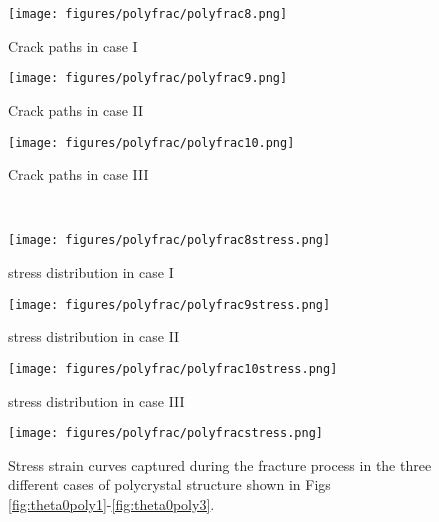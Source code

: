 \documentclass[3p,10pt,sort&compress]{elsarticle}
\begin{document}
\begin{figure*}[!htb]
	\centering
  \begin{subfigure}{0.32\textwidth}
		\texttt{[image: figures/polyfrac/polyfrac8.png]}
		\caption{Crack paths in case I}
	  \label{fig:fracpoly1}
	\end{subfigure}
	\begin{subfigure}{0.32\textwidth}
    \texttt{[image: figures/polyfrac/polyfrac9.png]}
		\caption{Crack paths in case II}
	  \label{fig:fracpoly2}
	\end{subfigure}
	\begin{subfigure}{0.32\textwidth}
    \texttt{[image: figures/polyfrac/polyfrac10.png]}
		\caption{Crack paths in case III}
	  \label{fig:fracpoly3}
	\end{subfigure}
  \\
  \begin{subfigure}{0.32\textwidth}
    \texttt{[image: figures/polyfrac/polyfrac8stress.png]}
    \caption{stress distribution in case I}
    \label{fig:stresscase1}
  \end{subfigure}
  \begin{subfigure}{0.32\textwidth}
    \texttt{[image: figures/polyfrac/polyfrac9stress.png]}
    \caption{stress distribution in case II}
    \label{fig:stresscase2}
  \end{subfigure}
  \begin{subfigure}{0.32\textwidth}
    \texttt{[image: figures/polyfrac/polyfrac10stress.png]}
    \caption{stress distribution in case III}
    \label{fig:stresscase3}
  \end{subfigure}
	\caption{Final crack paths in the three different cases shown in Figs. \ref{fig:fracpoly1}-\ref{fig:fracpoly3} corresponding to the different angles applied on the grains shown in Figs. \ref{fig:theta0poly1}-\ref{fig:theta0poly3}, respectively. And the stress distribution in the polycrystal structure for the three cases at time $t= 8.82 \mu s, t = 8.945\mu s,t=8.78\mu s$, respectively.}
  \label{fig:polyfracpath}
\end{figure*}

\begin{figure}[!htb]
  \begin{center}
    \texttt{[image: figures/polyfrac/polyfracstress.png]}
    \caption{Stress strain curves captured during the fracture process in the three different cases of polycrystal structure shown in Figs \ref{fig:theta0poly1}-\ref{fig:theta0poly3}.}
    \label{fig:polystress}
  \end{center}
\end{figure}
\end{document}
